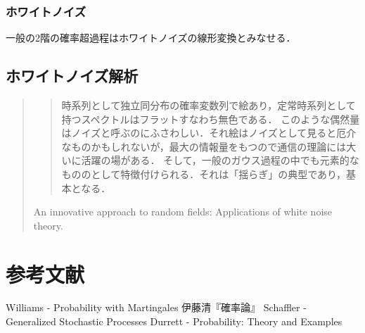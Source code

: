 \documentclass[uplatex,dvipdfmx]{jsreport}
\begin{document}
\subsection{ホワイトノイズ}

\begin{tcolorbox}[colframe=ForestGreen, colback=ForestGreen!10!white,breakable,colbacktitle=ForestGreen!40!white,coltitle=black,fonttitle=\bfseries\sffamily,
title=]
    一般の2階の確率超過程はホワイトノイズの線形変換とみなせる．
\end{tcolorbox}

\section{ホワイトノイズ解析}

\begin{quotation}
    \begin{quote}
        時系列として独立同分布の確率変数列で絵あり，定常時系列として持つスペクトルはフラットすなわち無色である．
        このような偶然量はノイズと呼ぶのにふさわしい．それ絵はノイズとして見ると厄介なものかもしれないが，最大の情報量をもつので通信の理論には大いに活躍の場がある．
        そして，一般のガウス過程の中でも元素的なもののとして特徴付けられる．それは「揺らぎ」の典型であり，基本となる．
    \end{quote}
    An innovative approach to random fields: Applications of white noise theory.
\end{quotation}

\chapter{参考文献}

\begin{thebibliography}{99}
    Williams - Probability with Martingales
    伊藤清『確率論』
    Schaffler - Generalized Stochastic Processes
    Durrett - Probability: Theory and Examples
\end{thebibliography}
\end{document}
